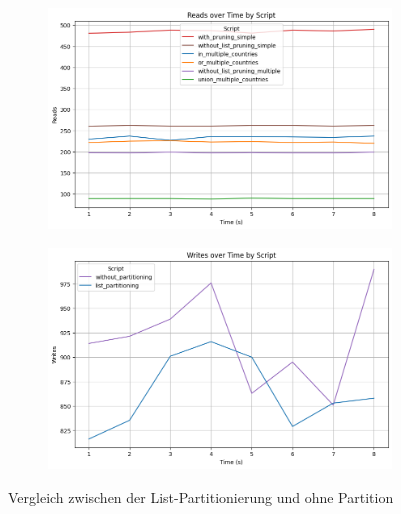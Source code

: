 \vspace{-8pt}
\begin{figure}[H]
	\centering
	\begin{subfigure}[t]{0.48\textwidth}
		\centering
		\includegraphics[width=\textwidth]{PNGs/Script/Partition/list-partition/Reads}
		\label{list-partition-reads}
	\end{subfigure}
	\hfill
	\begin{subfigure}[t]{0.48\textwidth}
		\centering
		\includegraphics[width=\textwidth]{PNGs/Script/Partition/list-partition/Writes}
		\label{list-partition-writes}
	\end{subfigure}
	\vspace{-20pt}
	\caption[List-Partitionierung: Metrikvergleich]{Vergleich zwischen der List-Partitionierung und ohne Partition}
	\label{fig:list-partition}
\end{figure}
\vspace{-20pt}

